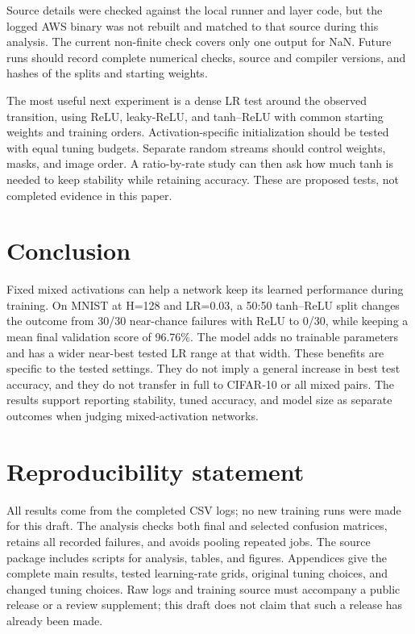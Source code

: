 \documentclass[10pt]{article}
\begin{document}
Source details were checked against the local runner and layer code, but the logged AWS binary was not rebuilt and matched to that source during this analysis. The current non-finite check covers only one output for NaN. Future runs should record complete numerical checks, source and compiler versions, and hashes of the splits and starting weights.

The most useful next experiment is a dense LR test around the observed transition, using ReLU, leaky-ReLU, and tanh--ReLU with common starting weights and training orders. Activation-specific initialization should be tested with equal tuning budgets. Separate random streams should control weights, masks, and image order. A ratio-by-rate study can then ask how much tanh is needed to keep stability while retaining accuracy. These are proposed tests, not completed evidence in this paper.

\section{Conclusion}
Fixed mixed activations can help a network keep its learned performance during training. On MNIST at H=128 and LR=0.03, a 50:50 tanh--ReLU split changes the outcome from 30/30 near-chance failures with ReLU to 0/30, while keeping a mean final validation score of 96.76\%. The model adds no trainable parameters and has a wider near-best tested LR range at that width. These benefits are specific to the tested settings. They do not imply a general increase in best test accuracy, and they do not transfer in full to CIFAR-10 or all mixed pairs. The results support reporting stability, tuned accuracy, and model size as separate outcomes when judging mixed-activation networks.

\section*{Reproducibility statement}
All results come from the completed CSV logs; no new training runs were made for this draft. The analysis checks both final and selected confusion matrices, retains all recorded failures, and avoids pooling repeated jobs. The source package includes scripts for analysis, tables, and figures. Appendices give the complete main results, tested learning-rate grids, original tuning choices, and changed tuning choices. Raw logs and training source must accompany a public release or a review supplement; this draft does not claim that such a release has already been made.
\end{document}
